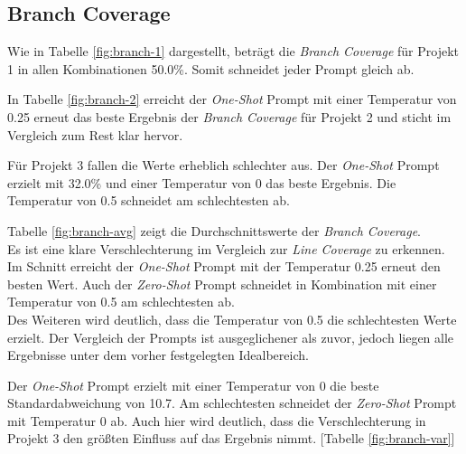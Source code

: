 \subsection{Branch Coverage}
Wie in Tabelle \ref{fig:branch-1} dargestellt, beträgt die \textit{Branch Coverage} für Projekt 1 in allen Kombinationen 50.0\%. Somit schneidet jeder Prompt gleich ab.

In Tabelle \ref{fig:branch-2} erreicht der \textit{One-Shot} Prompt mit einer Temperatur von 0.25 erneut das beste Ergebnis der \textit{Branch Coverage} für Projekt 2 und sticht im Vergleich zum Rest klar hervor.

Für Projekt 3 fallen die Werte erheblich schlechter aus. Der \textit{One-Shot} Prompt erzielt mit 32.0\% und einer Temperatur von 0 das beste Ergebnis. Die Temperatur von 0.5 schneidet am schlechtesten ab.

Tabelle \ref{fig:branch-avg} zeigt die Durchschnittswerte der \textit{Branch Coverage}. \\Es ist eine klare Verschlechterung im Vergleich zur \textit{Line Coverage} zu erkennen. Im Schnitt erreicht der \textit{One-Shot} Prompt mit der Temperatur 0.25 erneut den besten Wert. Auch der \textit{Zero-Shot} Prompt schneidet in Kombination mit einer Temperatur von 0.5 am schlechtesten ab.\\ Des Weiteren wird deutlich, dass die Temperatur von 0.5 die schlechtesten Werte erzielt. Der Vergleich der Prompts ist ausgeglichener als zuvor, jedoch liegen alle Ergebnisse unter dem vorher festgelegten Idealbereich. 

Der \textit{One-Shot} Prompt erzielt mit einer Temperatur von 0 die beste Standardabweichung von 10.7. Am schlechtesten schneidet der \textit{Zero-Shot} Prompt mit Temperatur 0 ab. Auch hier wird deutlich, dass die Verschlechterung in Projekt 3 den größten Einfluss auf das Ergebnis nimmt. [Tabelle \ref{fig:branch-var}]


